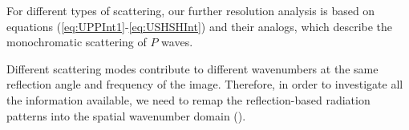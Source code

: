 For different types of scattering, our further resolution analysis is based on equations 
(\ref{eq:UPPInt1}-\ref{eq:USHSHInt}) and their analogs, which describe the monochromatic scattering of $P$ waves.

 

Different scattering modes contribute to different wavenumbers at 
the same reflection angle and frequency of the image. Therefore, in order to investigate all the
information available, we need to remap the reflection-based radiation patterns into 
the spatial wavenumber domain ().




